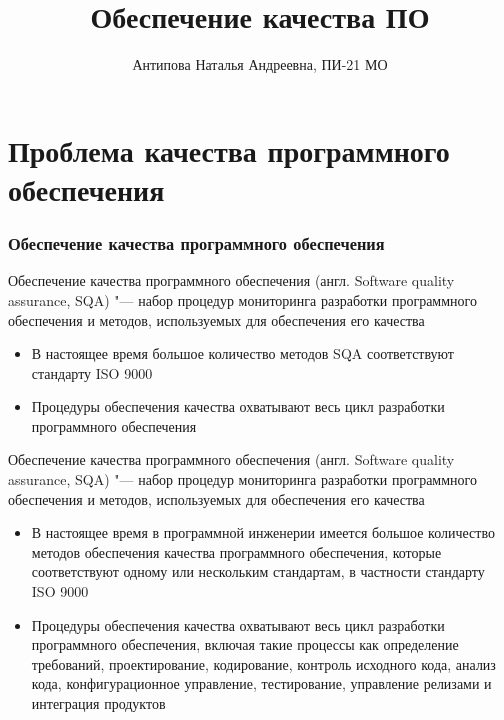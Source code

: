 \documentclass{../industrial-development}
\title{Обеспечение качества ПО}
\author{Антипова Наталья Андреевна, ПИ-21 МО}
\date{}
\begin{document}
\begin{frame}
  \titlepage
\end{frame}



\section{Проблема качества программного обеспечения}
\begin{frame} \frametitle{Обеспечение качества программного обеспечения}
  \begin{block}{}
	\alert{Обеспечение качества программного обеспечения} (англ. Software quality assurance, SQA) "--- набор процедур мониторинга разработки программного обеспечения и методов, используемых для обеспечения его качества 
  \end{block}
 	 \begin{itemize}
\item В настоящее время большое количество методов SQA соответствуют стандарту ISO 9000
\item Процедуры обеспечения качества охватывают весь цикл разработки программного обеспечения
  	\end{itemize}
\end{frame}

\lecturenotes

	\alert{Обеспечение качества программного обеспечения} (англ. Software quality assurance, SQA) "--- набор процедур мониторинга разработки программного обеспечения и методов, используемых для обеспечения его качества 
	 \begin{itemize}
\item В настоящее время в программной инженерии имеется большое количество методов обеспечения качества программного обеспечения, которые соответствуют одному или нескольким стандартам, в частности стандарту ISO 9000
\item Процедуры обеспечения качества охватывают весь цикл разработки программного обеспечения, включая такие процессы как определение требований, проектирование, кодирование, контроль исходного кода, анализ кода, конфигурационное управление, тестирование, управление релизами и интеграция продуктов
  	\end{itemize}
\end{document}
